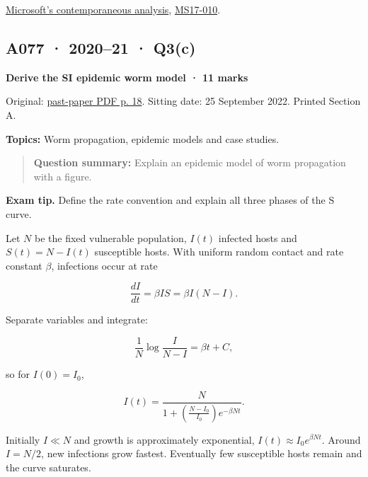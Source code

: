 \documentclass[11pt,a4paper]{article}
\begin{document}
\href{https://www.microsoft.com/en-us/security/blog/2017/05/12/wannacrypt-ransomware-worm-targets-out-of-date-systems/}{Microsoft's contemporaneous analysis},\allowbreak{} \href{https://learn.microsoft.com/en-us/security-updates/securitybulletins/2017/ms17-010}{MS17-010}.




\clearpage
\subsection{A077 · 2020–21 · Q3(c)}\label{a077}

\textbf{Derive the SI epidemic worm model · 11 marks}


Original: \href{../../CSE405-Security_Merged.pdf\#page=18}{past-paper PDF p. 18}. Sitting date: 25 September 2022. Printed Section A.


\textbf{Topics:} Worm propagation,\allowbreak{} epidemic models and case studies.



\begin{quote}\small

\textbf{Question summary:} Explain an epidemic model of worm propagation with a figure.



\end{quote}


{\color{ForestGreen}\textbf{Exam tip.} Define the rate convention and explain all three phases of the S curve.}


Let \(N\) be the fixed vulnerable population,\allowbreak{} \(I(t)\) infected hosts and \(S(t)=N-I(t)\) susceptible hosts. With uniform random contact and rate constant \(\beta\),\allowbreak{} infections occur at rate



\[
\frac{dI}{dt}=\beta I S=\beta I(N-I).
\]

Separate variables and integrate:



\[
\frac{1}{N}\log\frac{I}{N-I}=\beta t+C,
\]

so for \(I(0)=I_0\),\allowbreak{}



\[
I(t)=\frac{N}{1+\left(\frac{N-I_0}{I_0}\right)e^{-\beta Nt}}.
\]

Initially \(I\ll N\) and growth is approximately exponential,\allowbreak{} \(I(t)\approx I_0e^{\beta Nt}\). Around \(I=N/2\),\allowbreak{} new infections grow fastest. Eventually few susceptible hosts remain and the curve saturates.
\end{document}
